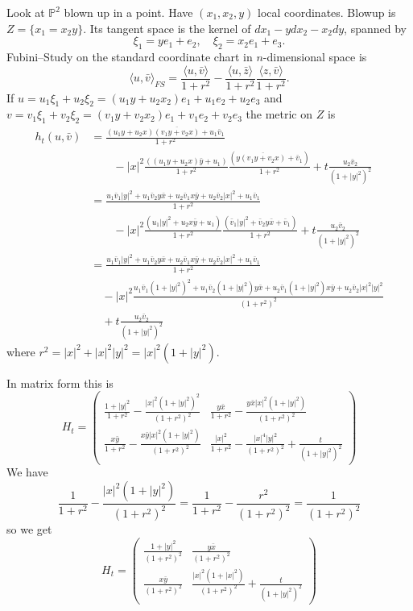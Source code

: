 \documentclass[10pt,a4paper]{amsart}
\newcommand{\kk}[1]{\mathbb{#1}}
\def\<{\langle}
\def\>{\rangle}
\def\ov#1{\overline{#1}}
\begin{document}
Look at $\kk P^2$ blown up in a point.
Have $(x_1,x_2,y)$ local coordinates.
Blowup is $Z = \{x_1 = x_2 y\}$.
Its tangent space is the kernel of $dx_1 - y dx_2 - x_2 dy$, spanned by
$$
\xi_1 = y e_1 + e_2,
\quad
\xi_2 = x_2 e_1 + e_3.
$$
Fubini--Study on the standard coordinate chart in $n$-dimensional space is
$$
\<u, \bar v\>_{FS}
= \frac{\<u, \bar v\>}{1+r^2}
- \frac{\<u, \bar z\>}{1+r^2}\frac{\<z, \bar v\>}{1+r^2}.
$$
If $u = u_1 \xi_1 + u_2 \xi_2 = (u_1 y + u_2 x_2) e_1 + u_1 e_2 + u_2 e_3$ and
$v = v_1 \xi_1 + v_2 \xi_2 = (v_1 y + v_2 x_2) e_1 + v_1 e_2 + v_2 e_3$ the
metric on $Z$ is
\begin{align*}
h_t(u, \bar v)
&= \frac{(u_1 y + u_2 x)\ov{(v_1 y + v_2 x)} + u_1 \bar v_1}{1 + r^2}
\\
&\qquad
- |x|^2 \frac{((u_1y + u_2x) \bar y + u_1)}{1+r^2}
\frac{(y\ov{(v_1 y + v_2 x)} + \bar v_1)}{1+r^2}
+ t \frac{u_2 \bar v_2}{(1+|y|^2)^2}
\\
&= \frac{
u_1 \bar v_1 |y|^2
+ u_1 \bar v_2 y \bar x
+ u_2 \bar v_1 x \bar y
+ u_2 \bar v_2 |x|^2
+ u_1 \bar v_1}{1 + r^2}
\\
&\qquad
- |x|^2 \frac{(u_1 |y|^2 + u_2 x \bar y + u_1)}{1+r^2}
\frac{(\bar v_1 |y|^2 + \bar v_2 y \bar x + \bar v_1)}{1+r^2}
+ t \frac{u_2 \bar v_2}{(1+|y|^2)^2}
\\
&= \frac{
u_1 \bar v_1 |y|^2
+ u_1 \bar v_2 y \bar x
+ u_2 \bar v_1 x \bar y
+ u_2 \bar v_2 |x|^2
+ u_1 \bar v_1}{1 + r^2}
\\
&\quad
- |x|^2
\frac{
u_1 \bar v_1 (1{+}|y|^2)^2
+ u_1 \bar v_2 (1{+}|y|^2) y \bar x
+ u_2 \bar v_1 (1{+}|y|^2) x \bar y
+ u_2 \bar v_2 |x|^2 |y|^2
}{(1+r^2)^2}
\\
&\quad
+ t \frac{u_2 \bar v_2}{(1+|y|^2)^2}
\end{align*}
where $r^2 = |x|^2 + |x|^2|y|^2 = |x|^2(1+|y|^2)$.

In matrix form this is
$$
H_t = \begin{pmatrix}
\frac{1 + |y|^2}{1+r^2} - \frac{|x|^2(1+|y|^2)^2}{(1+r^2)^2} &
\frac{y \bar x}{1+r^2} - \frac{y \bar x|x|^2(1+|y|^2)}{(1+r^2)^2}
\\
\frac{x \bar y}{1+r^2} - \frac{x \bar y|x|^2(1+|y|^2)}{(1+r^2)^2} &
\frac{|x|^2}{1+r^2} - \frac{|x|^4|y|^2}{(1+r^2)^2} + \frac{t}{(1+|y|^2)^2}
\end{pmatrix}
$$
We have
$$
\frac{1}{1+r^2} - \frac{|x|^2(1+|y|^2)}{(1+r^2)^2}
= \frac{1}{1+r^2} - \frac{r^2}{(1+r^2)^2}
= \frac{1}{(1+r^2)^2}
$$
so we get
$$
H_t = \begin{pmatrix}
\frac{1 + |y|^2}{(1+r^2)^2} &
\frac{y \bar x}{(1+r^2)^2}
\\
\frac{x \bar y}{(1+r^2)^2} &
\frac{|x|^2(1+|x|^2)}{(1+r^2)^2} + \frac{t}{(1+|y|^2)^2}
\end{pmatrix}
$$
\end{document}
